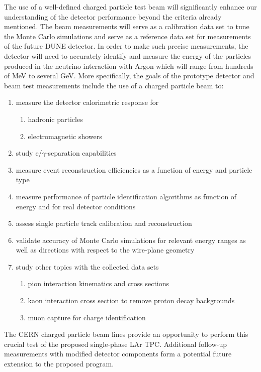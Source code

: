 The use of a well-defined charged particle test beam will significantly enhance our understanding of the detector performance beyond the criteria already mentioned.
The beam measurements will serve as a calibration data set to tune the Monte Carlo simulations and serve as a reference data set for measurements of the future DUNE detector. 
%
In order to make such precise measurements, the detector will need to accurately identify and measure the energy of the particles produced in the neutrino interaction with Argon which will range from hundreds of MeV to several GeV.
%
More specifically, the goals of the prototype detector and beam test measurements include the use of a charged particle beam to:
\begin{enumerate}
\item measure the detector calorimetric response for
\begin{enumerate}
	\item hadronic particles
	\item electromagnetic showers
\end{enumerate}
\item study e/$\gamma$-separation capabilities
\item measure event reconstruction efficiencies as a function of energy and particle type
\item measure performance of particle identification algorithms as function of energy and for real detector conditions
\item assess single particle track calibration and reconstruction
\item validate accuracy of Monte Carlo simulations for relevant energy ranges as well as directions with respect to the wire-plane geometry

\item study other topics with the collected data sets
 \begin{enumerate}
    \item pion interaction kinematics and cross sections
    \item kaon interaction cross section to remove proton decay backgrounds
    \item muon capture for charge identification
 \end{enumerate}
\end{enumerate}
%
The CERN charged particle beam lines provide an opportunity to perform this crucial test of the 
proposed single-phase LAr TPC.
%
%
Additional follow-up measurements with modified detector components form a potential future extension 
to the proposed program.\\


